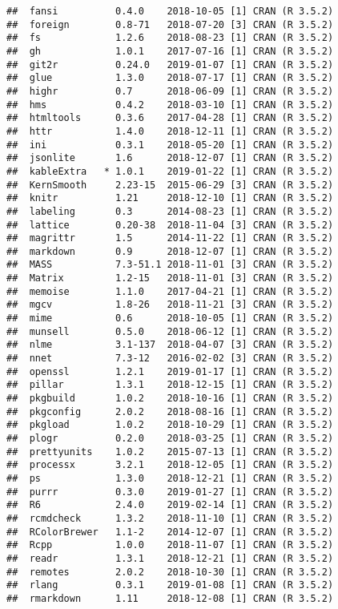 \documentclass[]{book}
\begin{document}
\begin{verbatim}
##  fansi          0.4.0    2018-10-05 [1] CRAN (R 3.5.2)
##  foreign        0.8-71   2018-07-20 [3] CRAN (R 3.5.2)
##  fs             1.2.6    2018-08-23 [1] CRAN (R 3.5.2)
##  gh             1.0.1    2017-07-16 [1] CRAN (R 3.5.2)
##  git2r          0.24.0   2019-01-07 [1] CRAN (R 3.5.2)
##  glue           1.3.0    2018-07-17 [1] CRAN (R 3.5.2)
##  highr          0.7      2018-06-09 [1] CRAN (R 3.5.2)
##  hms            0.4.2    2018-03-10 [1] CRAN (R 3.5.2)
##  htmltools      0.3.6    2017-04-28 [1] CRAN (R 3.5.2)
##  httr           1.4.0    2018-12-11 [1] CRAN (R 3.5.2)
##  ini            0.3.1    2018-05-20 [1] CRAN (R 3.5.2)
##  jsonlite       1.6      2018-12-07 [1] CRAN (R 3.5.2)
##  kableExtra   * 1.0.1    2019-01-22 [1] CRAN (R 3.5.2)
##  KernSmooth     2.23-15  2015-06-29 [3] CRAN (R 3.5.2)
##  knitr          1.21     2018-12-10 [1] CRAN (R 3.5.2)
##  labeling       0.3      2014-08-23 [1] CRAN (R 3.5.2)
##  lattice        0.20-38  2018-11-04 [3] CRAN (R 3.5.2)
##  magrittr       1.5      2014-11-22 [1] CRAN (R 3.5.2)
##  markdown       0.9      2018-12-07 [1] CRAN (R 3.5.2)
##  MASS           7.3-51.1 2018-11-01 [3] CRAN (R 3.5.2)
##  Matrix         1.2-15   2018-11-01 [3] CRAN (R 3.5.2)
##  memoise        1.1.0    2017-04-21 [1] CRAN (R 3.5.2)
##  mgcv           1.8-26   2018-11-21 [3] CRAN (R 3.5.2)
##  mime           0.6      2018-10-05 [1] CRAN (R 3.5.2)
##  munsell        0.5.0    2018-06-12 [1] CRAN (R 3.5.2)
##  nlme           3.1-137  2018-04-07 [3] CRAN (R 3.5.2)
##  nnet           7.3-12   2016-02-02 [3] CRAN (R 3.5.2)
##  openssl        1.2.1    2019-01-17 [1] CRAN (R 3.5.2)
##  pillar         1.3.1    2018-12-15 [1] CRAN (R 3.5.2)
##  pkgbuild       1.0.2    2018-10-16 [1] CRAN (R 3.5.2)
##  pkgconfig      2.0.2    2018-08-16 [1] CRAN (R 3.5.2)
##  pkgload        1.0.2    2018-10-29 [1] CRAN (R 3.5.2)
##  plogr          0.2.0    2018-03-25 [1] CRAN (R 3.5.2)
##  prettyunits    1.0.2    2015-07-13 [1] CRAN (R 3.5.2)
##  processx       3.2.1    2018-12-05 [1] CRAN (R 3.5.2)
##  ps             1.3.0    2018-12-21 [1] CRAN (R 3.5.2)
##  purrr          0.3.0    2019-01-27 [1] CRAN (R 3.5.2)
##  R6             2.4.0    2019-02-14 [1] CRAN (R 3.5.2)
##  rcmdcheck      1.3.2    2018-11-10 [1] CRAN (R 3.5.2)
##  RColorBrewer   1.1-2    2014-12-07 [1] CRAN (R 3.5.2)
##  Rcpp           1.0.0    2018-11-07 [1] CRAN (R 3.5.2)
##  readr          1.3.1    2018-12-21 [1] CRAN (R 3.5.2)
##  remotes        2.0.2    2018-10-30 [1] CRAN (R 3.5.2)
##  rlang          0.3.1    2019-01-08 [1] CRAN (R 3.5.2)
##  rmarkdown      1.11     2018-12-08 [1] CRAN (R 3.5.2)

\end{verbatim}
\end{document}
